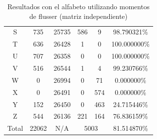 \documentclass[a4paper, 11pt, oneside]{report}
\begin{document}
\begin{table}
\begin{tabular}{|c|c|c|c|c|c|}
	S & 735 & 25735 & 586 & 9 & 98.790321\% \\ 
	T & 636 & 26428 & 1 & 0 & 100.000000\% \\ 
	U & 707 & 26358 & 0 & 0 & 100.000000\% \\ 
	V & 516 & 26544 & 1 & 4 & 99.230766\% \\ 
	W & 0 & 26994 & 0 & 71 & 0.000000\% \\ 
	X & 0 & 26491 & 0 & 574 & 0.000000\% \\ 
	Y & 152 & 26450 & 0 & 463 & 24.715446\% \\ 
	Z & 544 & 26136 & 221 & 164 & 76.836159\% \\ 
	\hline
	Total & 22062 & N/A & \multicolumn{2}{|c|}{5003} & 81.514870\% \\
	\hline
\end{tabular}
\caption{Resultados con el alfabeto utilizando momentos de flusser (matriz independiente)}
\label{tb:alphaFlIndep}
\end{table}
\end{document}
